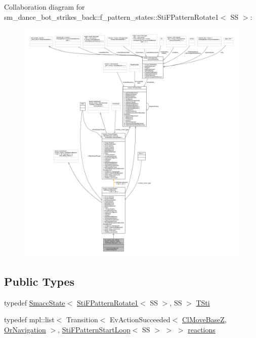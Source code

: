 Collaboration diagram for sm\+\_\+dance\+\_\+bot\+\_\+strikes\+\_\+back\+:\+:f\+\_\+pattern\+\_\+states\+:\+:Sti\+F\+Pattern\+Rotate1$<$ SS $>$\+:
\nopagebreak
\begin{figure}[H]
\begin{center}
\leavevmode
\includegraphics[width=350pt]{structsm__dance__bot__strikes__back_1_1f__pattern__states_1_1StiFPatternRotate1__coll__graph}
\end{center}
\end{figure}
\subsection*{Public Types}
\begin{DoxyCompactItemize}
\item 
typedef \hyperlink{classSmaccState}{Smacc\+State}$<$ \hyperlink{structsm__dance__bot__strikes__back_1_1f__pattern__states_1_1StiFPatternRotate1}{Sti\+F\+Pattern\+Rotate1}$<$ SS $>$, SS $>$ \hyperlink{structsm__dance__bot__strikes__back_1_1f__pattern__states_1_1StiFPatternRotate1_ac35c904f7bbee9538b86251490407684}{T\+Sti}
\item 
typedef mpl\+::list$<$ Transition$<$ Ev\+Action\+Succeeded$<$ \hyperlink{classmove__base__z__client_1_1ClMoveBaseZ}{Cl\+Move\+BaseZ}, \hyperlink{classsm__dance__bot__strikes__back_1_1OrNavigation}{Or\+Navigation} $>$, \hyperlink{structsm__dance__bot__strikes__back_1_1f__pattern__states_1_1StiFPatternStartLoop}{Sti\+F\+Pattern\+Start\+Loop}$<$ SS $>$ $>$ $>$ \hyperlink{structsm__dance__bot__strikes__back_1_1f__pattern__states_1_1StiFPatternRotate1_aba05d27680e46c9e1c82162fef32ad32}{reactions}
\end{DoxyCompactItemize}
